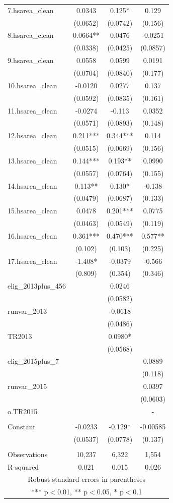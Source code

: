 \documentclass[]{article}
\begin{document}
\begin{tabular}{lccc}
7.hsarea\_clean & 0.0343 & 0.125* & 0.129 \\
 & (0.0652) & (0.0742) & (0.156) \\
8.hsarea\_clean & 0.0664** & 0.0476 & -0.0251 \\
 & (0.0338) & (0.0425) & (0.0857) \\
9.hsarea\_clean & 0.0558 & 0.0599 & 0.0191 \\
 & (0.0704) & (0.0840) & (0.177) \\
10.hsarea\_clean & -0.0120 & 0.0277 & 0.137 \\
 & (0.0592) & (0.0835) & (0.161) \\
11.hsarea\_clean & -0.0274 & -0.113 & 0.0352 \\
 & (0.0571) & (0.0893) & (0.148) \\
12.hsarea\_clean & 0.211*** & 0.344*** & 0.114 \\
 & (0.0515) & (0.0669) & (0.156) \\
13.hsarea\_clean & 0.144*** & 0.193** & 0.0990 \\
 & (0.0557) & (0.0764) & (0.155) \\
14.hsarea\_clean & 0.113** & 0.130* & -0.138 \\
 & (0.0479) & (0.0687) & (0.133) \\
15.hsarea\_clean & 0.0478 & 0.201*** & 0.0775 \\
 & (0.0463) & (0.0549) & (0.119) \\
16.hsarea\_clean & 0.361*** & 0.470*** & 0.577** \\
 & (0.102) & (0.103) & (0.225) \\
17.hsarea\_clean & -1.408* & -0.0379 & -0.566 \\
 & (0.809) & (0.354) & (0.346) \\
elig\_2013plus\_456 &  & 0.0246 &  \\
 &  & (0.0582) &  \\
runvar\_2013 &  & -0.0618 &  \\
 &  & (0.0486) &  \\
TR2013 &  & 0.0980* &  \\
 &  & (0.0568) &  \\
elig\_2015plus\_7 &  &  & 0.0889 \\
 &  &  & (0.118) \\
runvar\_2015 &  &  & 0.0397 \\
 &  &  & (0.0603) \\
o.TR2015 &  &  & - \\
 &  &  &  \\
Constant & -0.0233 & -0.129* & -0.00585 \\
 & (0.0537) & (0.0778) & (0.137) \\
 &  &  &  \\
Observations & 10,237 & 6,322 & 1,554 \\
 R-squared & 0.021 & 0.015 & 0.026 \\ \hline
\multicolumn{4}{c}{ Robust standard errors in parentheses} \\
\multicolumn{4}{c}{ *** p$<$0.01, ** p$<$0.05, * p$<$0.1} \\
\end{tabular}
\end{document}
